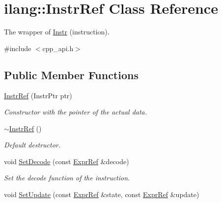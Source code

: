 \hypertarget{classilang_1_1_instr_ref}{}\section{ilang\+:\+:Instr\+Ref Class Reference}
\label{classilang_1_1_instr_ref}


The wrapper of \mbox{\hyperlink{classilang_1_1_instr}{Instr}} (instruction).  




{\ttfamily \#include $<$cpp\+\_\+api.\+h$>$}

\subsection*{Public Member Functions}
\begin{DoxyCompactItemize}
\item 
\mbox{\label{classilang_1_1_instr_ref_a135d8d3d80743910945d03a04909db2a}} 
\mbox{\hyperlink{classilang_1_1_instr_ref_a135d8d3d80743910945d03a04909db2a}{Instr\+Ref}} (Instr\+Ptr ptr)
\begin{DoxyCompactList}\small\item\em Constructor with the pointer of the actual data. \end{DoxyCompactList}\item 
\mbox{\label{classilang_1_1_instr_ref_ad308a4b25d1a9904fdd27d8de57b747f}} 
\mbox{\hyperlink{classilang_1_1_instr_ref_ad308a4b25d1a9904fdd27d8de57b747f}{$\sim$\+Instr\+Ref}} ()
\begin{DoxyCompactList}\small\item\em Default destructor. \end{DoxyCompactList}\item 
void \mbox{\hyperlink{classilang_1_1_instr_ref_a5cfba90d3110e6a484fbef83a9f19c0e}{Set\+Decode}} (const \mbox{\hyperlink{classilang_1_1_expr_ref}{Expr\+Ref}} \&decode)
\begin{DoxyCompactList}\small\item\em Set the decode function of the instruction. \end{DoxyCompactList}\item 
void \mbox{\hyperlink{classilang_1_1_instr_ref_af71d7eb364db7f78451a8cf4f268840c}{Set\+Update}} (const \mbox{\hyperlink{classilang_1_1_expr_ref}{Expr\+Ref}} \&state, const \mbox{\hyperlink{classilang_1_1_expr_ref}{Expr\+Ref}} \&update)

\end{DoxyCompactItemize}
